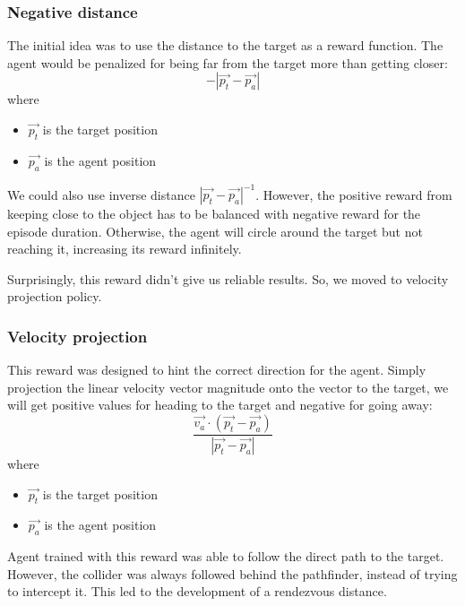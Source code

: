 \subsubsection{Negative distance}
The initial idea was to use the distance to the target as a reward function.
The agent would be penalized for being far from the target more than getting closer:
\[
	-\left|\vec{p_t} - \vec{p_a}\right|
\] where
\begin{itemize}
	\item $\vec{p_t}$ is the target position
	\item $\vec{p_a}$ is the agent position
\end{itemize}

We could also use inverse distance ${\left|\vec{p_t} - \vec{p_a}\right|^{-1}}$.
However, the positive reward from keeping close to the object has to be balanced with negative reward for the episode duration.
Otherwise, the agent will circle around the target but not reaching it, increasing its reward infinitely.

Surprisingly, this reward didn't give us reliable results.
So, we moved to velocity projection policy.

\subsubsection{Velocity projection}
This reward was designed to hint the correct direction for the agent.
Simply projection the linear velocity vector magnitude onto the vector to the target, we will get positive values for heading to the target and negative for going away:
\[
	\frac{\vec{v_a} \cdot (\vec{p_t} - \vec{p_a})}{\left|\vec{p_t} - \vec{p_a}\right|}
\] where
\begin{itemize}
	\item $\vec{p_t}$ is the target position
	\item $\vec{p_a}$ is the agent position
\end{itemize}

Agent trained with this reward was able to follow the direct path to the target.
However, the collider was always followed behind the pathfinder, instead of trying to intercept it.
This led to the development of a rendezvous distance.

